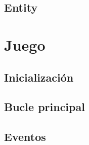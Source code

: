 \documentclass[parskip=half*]{scrartcl}
\begin{document}
	\subsection{Entity}


\newpage
\section{Juego}
	\subsection{Inicializaci\'on}

	\subsection{Bucle principal}

	\subsection{Eventos}

\end{document}
